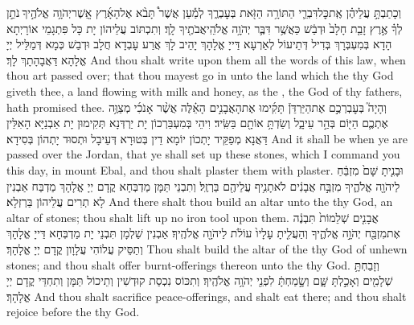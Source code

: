 {וְכָתַבְתָּ֣ עֲלֵיהֶ֗ן אֶֽת\maqqaf כׇּל\maqqaf דִּבְרֵ֛י הַתּוֹרָ֥ה הַזֹּ֖את בְּעׇבְרֶ֑ךָ לְמַ֡עַן אֲשֶׁר֩ תָּבֹ֨א אֶל\maqqaf הָאָ֜רֶץ אֲֽשֶׁר\maqqaf יְהֹוָ֥ה אֱלֹהֶ֣יךָ \legarmeh  נֹתֵ֣ן לְךָ֗ אֶ֣רֶץ זָבַ֤ת חָלָב֙ וּדְבַ֔שׁ כַּאֲשֶׁ֥ר דִּבֶּ֛ר יְהֹוָ֥ה אֱלֹהֵֽי\maqqaf אֲבֹתֶ֖יךָ לָֽךְ׃}
{וְתִכְתּוֹב עֲלֵיהוֹן יָת כָּל פִּתְגָמֵי אוֹרָיְתָא הָדָא בְּמִעְבְּרָךְ בְּדִיל דְּתֵיעוֹל לְאַרְעָא דַּייָ אֱלָהָךְ יָהֵיב לָךְ אֲרַע עָבְדָא חֲלָב וּדְבַשׁ כְּמָא דְּמַלֵּיל יְיָ אֱלָהָא דַּאֲבָהָתָךְ לָךְ׃}
{And thou shalt write upon them all the words of this law, when thou art passed over; that thou mayest go in unto the land which the \lord\space thy God giveth thee, a land flowing with milk and honey, as the \lord, the God of thy fathers, hath promised thee.}{}
{וְהָיָה֮ בְּעׇבְרְכֶ֣ם אֶת\maqqaf הַיַּרְדֵּן֒ תָּקִ֜ימוּ אֶת\maqqaf הָאֲבָנִ֣ים הָאֵ֗לֶּה אֲשֶׁ֨ר אָנֹכִ֜י מְצַוֶּ֥ה אֶתְכֶ֛ם הַיּ֖וֹם בְּהַ֣ר עֵיבָ֑ל וְשַׂדְתָּ֥ אוֹתָ֖ם בַּשִּֽׂיד׃}
{וִיהֵי בְּמִעְבַּרְכוֹן יָת יַרְדְּנָא תְּקִימוּן יָת אַבְנַיָּא הָאִלֵּין דַּאֲנָא מְפַקֵּיד יָתְכוֹן יוֹמָא דֵין בְּטוּרָא דְּעֵיבָל וּתְסוּד יָתְהוֹן בְּסִידָא׃}
{And it shall be when ye are passed over the Jordan, that ye shall set up these stones, which I command you this day, in mount Ebal, and thou shalt plaster them with plaster.}{}
{וּבָנִ֤יתָ שָּׁם֙ מִזְבֵּ֔חַ לַיהֹוָ֖ה אֱלֹהֶ֑יךָ מִזְבַּ֣ח אֲבָנִ֔ים לֹא\maqqaf תָנִ֥יף עֲלֵיהֶ֖ם בַּרְזֶֽל׃}
{וְתִבְנֵי תַּמָּן מַדְבְּחָא קֳדָם יְיָ אֱלָהָךְ מַדְבַּח אַבְנִין לָא תְרִים עֲלֵיהוֹן בַּרְזְלָא׃}
{And there shalt thou build an altar unto the \lord\space thy God, an altar of stones; thou shalt lift up no iron tool upon them.}{}
{אֲבָנִ֤ים שְׁלֵמוֹת֙ תִּבְנֶ֔ה אֶת\maqqaf מִזְבַּ֖ח יְהֹוָ֣ה אֱלֹהֶ֑יךָ וְהַעֲלִ֤יתָ עָלָיו֙ עוֹלֹ֔ת לַיהֹוָ֖ה אֱלֹהֶֽיךָ׃}
{אַבְנִין שַׁלְמָן תִּבְנֵי יָת מַדְבְּחָא דַּייָ אֱלָהָךְ וְתַסֵּיק עֲלוֹהִי עֲלָוָון קֳדָם יְיָ אֱלָהָךְ׃}
{Thou shalt build the altar of the \lord\space thy God of unhewn stones; and thou shalt offer burnt-offerings thereon unto the \lord\space thy God.}{}
{וְזָבַחְתָּ֥ שְׁלָמִ֖ים וְאָכַ֣לְתָּ שָּׁ֑ם וְשָׂ֣מַחְתָּ֔ לִפְנֵ֖י יְהֹוָ֥ה אֱלֹהֶֽיךָ׃}
{וְתִכּוֹס נִכְסַת קוּדְשִׁין וְתֵיכוֹל תַּמָּן וְתִחְדֵּי קֳדָם יְיָ אֱלָהָךְ׃}
{And thou shalt sacrifice peace-offerings, and shalt eat there; and thou shalt rejoice before the \lord\space thy God.}{}
